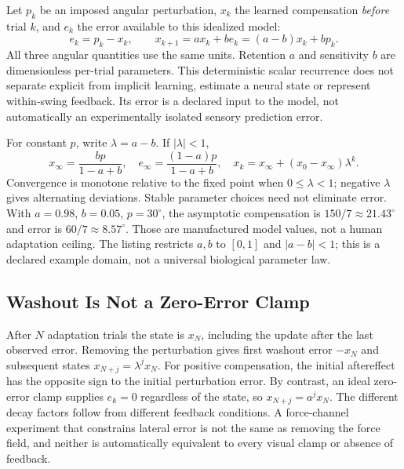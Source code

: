Let $p_k$ be an imposed angular perturbation, $x_k$ the learned compensation
\emph{before} trial $k$, and $e_k$ the error available to this idealized model:
\begin{equation}
 e_k=p_k-x_k,\qquad x_{k+1}=a x_k+b e_k=(a-b)x_k+b p_k.
 \label{eq:ch9:single-rate}
\end{equation}
All three angular quantities use the same units. Retention $a$ and sensitivity
$b$ are dimensionless per-trial parameters. This deterministic scalar recurrence
does not separate explicit from implicit learning, estimate a neural state or
represent within-swing feedback. Its error is a declared input to the model,
not automatically an experimentally isolated sensory prediction error.

For constant $p$, write $\lambda=a-b$. If $|\lambda|<1$,
\begin{equation}
 x_\infty=\frac{b p}{1-a+b},\quad
 e_\infty=\frac{(1-a)p}{1-a+b},\quad
 x_k=x_\infty+(x_0-x_\infty)\lambda^k.
\end{equation}
Convergence is monotone relative to the fixed point when $0\leq\lambda<1$;
negative $\lambda$ gives alternating deviations. Stable parameter choices need
not eliminate error. With $a=0.98$, $b=0.05$, $p=30^\circ$, the asymptotic
compensation is $150/7\approx21.43^\circ$ and error is
$60/7\approx8.57^\circ$. Those are manufactured model values, not a human
adaptation ceiling. The listing restricts $a,b$ to $[0,1]$ and $|a-b|<1$;
this is a declared example domain, not a universal biological parameter law.

\subsection{Washout Is Not a Zero-Error Clamp}

After $N$ adaptation trials the state is $x_N$, including the update after the
last observed error. Removing the perturbation gives first washout error
$-x_N$ and subsequent states $x_{N+j}=\lambda^j x_N$. For positive compensation,
the initial aftereffect has the opposite sign to the initial perturbation error.
By contrast, an ideal zero-error clamp supplies $e_k=0$ regardless of the state,
so $x_{N+j}=a^j x_N$. The different decay factors follow from different
feedback conditions. A force-channel experiment that constrains lateral error
is not the same as removing the force field, and neither is automatically
equivalent to every visual clamp or absence of feedback.

